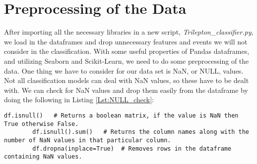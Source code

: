 \documentclass[a4paper, american, 12pt]{report}
\begin{document}
	\section{Preprocessing of the Data}
	\label{sect:Method-PrepData}
	After importing all the necessary libraries in a new script, \textit{Trilepton\_classifier.py}, we load in the dataframes and drop unnecessary features and events we will not consider in the classification. With some useful properties of Pandas dataframes, and utilizing Seaborn and Scikit-Learn, we need to do some preprocessing of the data. One thing we have to consider for our data set is NaN, or NULL, values. Not all classification models can deal with NaN values, so these have to be dealt with. We can check for NaN values and drop them easily from the dataframe by doing the following in Listing \ref{Lst:NULL_check}:
	\begin{lstlisting}[caption=Check NULL values., label=Lst:NULL_check]
		df.isnull()   # Returns a boolean matrix, if the value is NaN then True otherwise False.
		df.isnull().sum()   # Returns the column names along with the number of NaN values in that particular column.
		df.dropna(inplace=True)  # Removes rows in the dataframe containing NaN values.
	\end{lstlisting}
\end{document}
